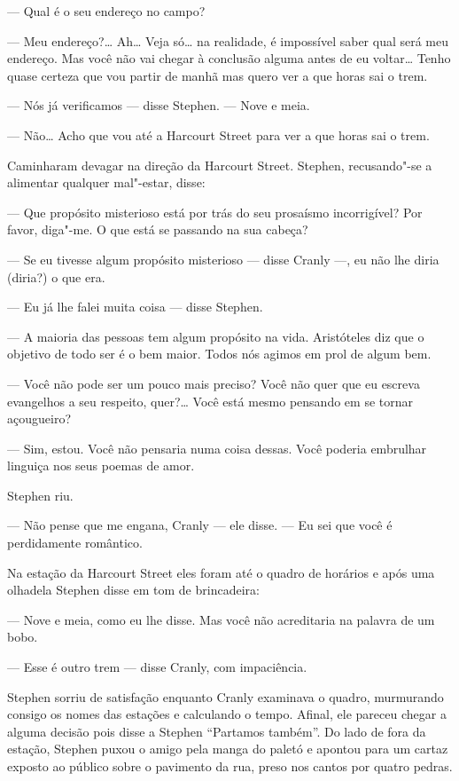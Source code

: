 --- Qual é o seu endereço no campo?

--- Meu endereço?\ldots{}  Ah\ldots{}  Veja só\ldots{} na realidade, é
impossível saber qual será meu endereço.  Mas você não vai chegar à
conclusão alguma antes de eu voltar\ldots{}  Tenho quase certeza que vou
partir de manhã mas quero ver a que horas sai o trem.

--- Nós já verificamos --- disse Stephen.  --- Nove e meia.

--- Não\ldots{}  Acho que vou até a Harcourt Street para ver a que
horas sai o trem.

Caminharam devagar na direção da Harcourt Street.  Stephen,
recusando"-se a alimentar qualquer mal"-estar, disse:

--- Que propósito misterioso está por trás do seu prosaísmo
incorrigível?  Por favor, diga"-me.  O que está se passando na sua
cabeça?

--- Se eu tivesse algum propósito misterioso --- disse Cranly ---,
eu não lhe diria (diria?) o que era.

--- Eu já lhe falei muita coisa --- disse Stephen.

--- A maioria das pessoas tem algum propósito na vida. 
Aristóteles diz que o objetivo de todo ser é o bem maior.  Todos nós
agimos em prol de algum bem.

--- Você não pode ser um pouco mais preciso?  Você não quer que
eu escreva evangelhos a seu respeito, quer?\ldots{}  Você está mesmo
pensando em se tornar açougueiro?

--- Sim, estou.  \label{voce"-nao"-pensaria} Você não pensaria numa coisa dessas.  Você
poderia embrulhar linguiça nos seus poemas de amor.

Stephen riu.

--- Não pense que me engana, Cranly --- ele disse.  --- Eu sei que
você é perdidamente romântico.

Na estação da Harcourt Street eles foram até o quadro de horários e
após uma olhadela Stephen disse em tom de brincadeira:

--- Nove e meia, como eu lhe disse.  Mas você não acreditaria na
palavra de um bobo.

--- Esse é outro trem --- disse Cranly, com impaciência.

Stephen sorriu de satisfação enquanto Cranly examinava o quadro,
murmurando consigo os nomes das estações e calculando o tempo.  Afinal,
ele pareceu chegar a alguma decisão pois disse a Stephen “Partamos
também”.  Do lado de fora da estação, Stephen puxou o amigo pela manga
do paletó e apontou para um cartaz exposto ao público sobre o pavimento
da rua, preso nos cantos por quatro pedras.


